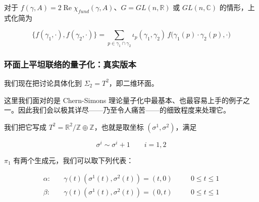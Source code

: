
对于 $f(\gamma,A)=2\operatorname{Re}\chi_{fund}(\gamma,A)$、$G=GL(n,\mathbb{R})$ 或 $GL(n,\mathbb{C})$ 的情形，上式化简为

\begin{equation}
  \{f(\gamma_1,\cdot),f(\gamma_2,\cdot)\}
  = \sum_{p\in\gamma_1\cap\gamma_2}\iota_p(\gamma_1,\gamma_2)\,f\big(\gamma_1(p)\cdot\gamma_2(p),\cdot\big)
  \tag{2.130}
  \label{eq:2.130}
\end{equation}

\subsubsection{环面上平坦联络的量子化：真实版本} %

我们现在把讨论具体化到 $\Sigma_2=T^2$，即二维环面。

这里我们面对的是 Chern-Simons 理论量子化中最基本、也最容易上手的例子之一。因此我们会以极其详尽——乃至令人痛苦——的细致程度来处理它。

我们把它写成 $T^2=\mathbb{R}^2/\mathbb{Z}\oplus\mathbb{Z}$，也就是取坐标 $(\sigma^1,\sigma^2)$，满足

\begin{equation}
  \sigma^i\sim\sigma^i+1 \qquad i=1,2
  \tag{2.131}
  \label{eq:2.131}
\end{equation}

$\pi_1$ 有两个生成元，我们可以取下列代表：

\begin{equation}
  \begin{aligned}
    \alpha:\quad & \gamma(t)(\sigma^1(t),\sigma^2(t))=(t,0) &\quad & 0\le t\le 1\\
    \beta:\quad & \gamma(t)(\sigma^1(t),\sigma^2(t))=(0,t) &\quad & 0\le t\le 1
  \end{aligned}
  \tag{2.132}
  \label{eq:2.132}
\end{equation}

